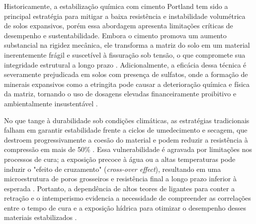 

Historicamente, a estabilização química com cimento Portland tem sido a principal estratégia para mitigar a baixa resistência e instabilidade volumétrica de solos expansivos, porém essa abordagem apresenta limitações críticas de desempenho e sustentabilidade. Embora o cimento promova um aumento substancial na rigidez mecânica, ele transforma a matriz do solo em um material inerentemente frágil e suscetível à fissuração sob tensão, o que compromete sua integridade estrutural a longo prazo \cite{Chen2024, Zhang2025, Lu2019}. Adicionalmente, a eficácia dessa técnica é severamente prejudicada em solos com presença de sulfatos, onde a formação de minerais expansivos como a etringita pode causar a deterioração química e física da matriz, tornando o uso de dosagens elevadas financeiramente proibitivo e ambientalmente insustentável \cite{Mahedi2018}.

No que tange à durabilidade sob condições climáticas, as estratégias tradicionais falham em garantir estabilidade frente a ciclos de umedecimento e secagem, que destroem progressivamente a coesão do material e podem reduzir a resistência à compressão em mais de 50\% \cite{Chen2024, Hu2024}. Essa vulnerabilidade é agravada por limitações nos processos de cura; a exposição precoce à água ou a altas temperaturas pode induzir o "efeito de cruzamento" (\textit{cross-over effect}), resultando em uma microestrutura de poros grosseiros e resistência final a longo prazo inferior à esperada \cite{AlGburi2025, Wang2022, Lu2019}. Portanto, a dependência de altos teores de ligantes para conter a retração e o intemperismo evidencia a necessidade de compreender as correlações entre o tempo de cura e a exposição hídrica para otimizar o desempenho desses materiais estabilizados \cite{Zhang2025}.


